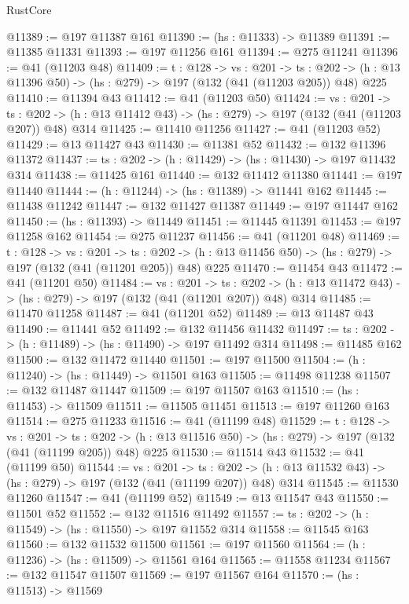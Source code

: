\begin{lexlean}{RustCore}
\begin{coremodule}
@11389 := @197 @11387 @161
@11390 := (hs : @11333) -> @11389
@11391 := @11385 @11331
@11393 := @197 @11256 @161
@11394 := @275 @11241
@11396 := @41 (@11203 @48)
@11409 := {t : @128} ->
  {vs : @201} ->
  {ts : @202} -> (h : @13 @11396 @50) -> (hs : @279) -> @197 (@132 (@41 (@11203 @205)) @48) @225
@11410 := @11394 @43
@11412 := @41 (@11203 @50)
@11424 := {vs : @201} ->
  {ts : @202} -> (h : @13 @11412 @43) -> (hs : @279) -> @197 (@132 (@41 (@11203 @207)) @48) @314
@11425 := @11410 @11256
@11427 := @41 (@11203 @52)
@11429 := @13 @11427 @43
@11430 := @11381 @52
@11432 := @132 @11396 @11372
@11437 := {ts : @202} -> (h : @11429) -> (hs : @11430) -> @197 @11432 @314
@11438 := @11425 @161
@11440 := @132 @11412 @11380
@11441 := @197 @11440
@11444 := (h : @11244) -> (hs : @11389) -> @11441 @162
@11445 := @11438 @11242
@11447 := @132 @11427 @11387
@11449 := @197 @11447 @162
@11450 := (hs : @11393) -> @11449
@11451 := @11445 @11391
@11453 := @197 @11258 @162
@11454 := @275 @11237
@11456 := @41 (@11201 @48)
@11469 := {t : @128} ->
  {vs : @201} ->
  {ts : @202} -> (h : @13 @11456 @50) -> (hs : @279) -> @197 (@132 (@41 (@11201 @205)) @48) @225
@11470 := @11454 @43
@11472 := @41 (@11201 @50)
@11484 := {vs : @201} ->
  {ts : @202} -> (h : @13 @11472 @43) -> (hs : @279) -> @197 (@132 (@41 (@11201 @207)) @48) @314
@11485 := @11470 @11258
@11487 := @41 (@11201 @52)
@11489 := @13 @11487 @43
@11490 := @11441 @52
@11492 := @132 @11456 @11432
@11497 := {ts : @202} -> (h : @11489) -> (hs : @11490) -> @197 @11492 @314
@11498 := @11485 @162
@11500 := @132 @11472 @11440
@11501 := @197 @11500
@11504 := (h : @11240) -> (hs : @11449) -> @11501 @163
@11505 := @11498 @11238
@11507 := @132 @11487 @11447
@11509 := @197 @11507 @163
@11510 := (hs : @11453) -> @11509
@11511 := @11505 @11451
@11513 := @197 @11260 @163
@11514 := @275 @11233
@11516 := @41 (@11199 @48)
@11529 := {t : @128} ->
  {vs : @201} ->
  {ts : @202} -> (h : @13 @11516 @50) -> (hs : @279) -> @197 (@132 (@41 (@11199 @205)) @48) @225
@11530 := @11514 @43
@11532 := @41 (@11199 @50)
@11544 := {vs : @201} ->
  {ts : @202} -> (h : @13 @11532 @43) -> (hs : @279) -> @197 (@132 (@41 (@11199 @207)) @48) @314
@11545 := @11530 @11260
@11547 := @41 (@11199 @52)
@11549 := @13 @11547 @43
@11550 := @11501 @52
@11552 := @132 @11516 @11492
@11557 := {ts : @202} -> (h : @11549) -> (hs : @11550) -> @197 @11552 @314
@11558 := @11545 @163
@11560 := @132 @11532 @11500
@11561 := @197 @11560
@11564 := (h : @11236) -> (hs : @11509) -> @11561 @164
@11565 := @11558 @11234
@11567 := @132 @11547 @11507
@11569 := @197 @11567 @164
@11570 := (hs : @11513) -> @11569

\end{coremodule}
\end{lexlean}
